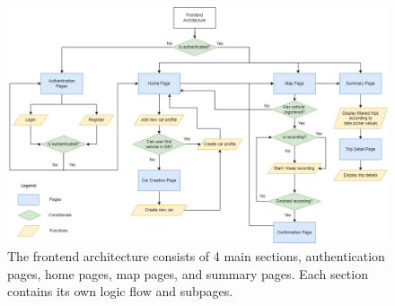 \documentclass[11pt, oneside]{article}
\begin{document}
\begin{figure}[!htb]
\centerline{\includegraphics[width=17cm]{img/architecture/Fuellytics-Frontend Architecture.png}}
\caption{\label{fig:frontend}The frontend architecture consists of 4 main sections, authentication pages, home pages, map pages, and summary pages. Each section contains its own logic flow and subpages.}
\end{figure}
\end{document}
